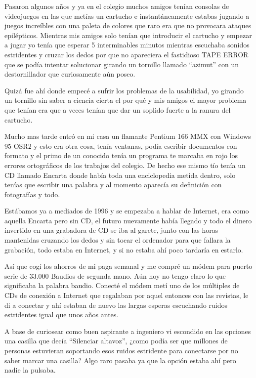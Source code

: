 \bigskip
Pasaron algunos años y ya en el colegio muchos amigos tenían consolas de videojuegos en las que metías un cartucho e instantáneamente estabas jugando a juegos increíbles con una paleta de colores que raro era que no provocara ataques epilépticos. Mientras mis amigos solo tenían que introducir el cartucho y empezar a jugar yo tenía que esperar 5 interminables minutos mientras escuchaba sonidos estridentes y cruzar los dedos por que no apareciera el fastidioso TAPE ERROR que se podía intentar solucionar girando un tornillo llamado ``azimut'' con un destornillador que curiosamente aún poseo.

\bigskip
Quizá fue ahí donde empecé a sufrir los problemas de la usabilidad, yo girando un tornillo sin saber a ciencia cierta el por qué y mis amigos el mayor problema que tenían era que a veces tenían que dar un soplido fuerte a la ranura del cartucho.

\bigskip
Mucho mas tarde entró en mi casa un flamante Pentium 166 MMX con Windows 95 OSR2 y esto era otra cosa, tenía ventanas, podía escribir documentos con formato y el primo de un conocido tenía un programa te marcaba en rojo los errores ortográficos de los trabajos del colegio. De hecho ese mismo tío tenía un CD llamado Encarta donde había toda una enciclopedia metida dentro, solo tenías que escribir una palabra y al momento aparecía su definición con fotografías y todo.

\bigskip
Estábamos ya a mediados de 1996 y se empezaba a hablar de Internet, era como aquella Encarta pero sin CD, el futuro nuevamente había llegado y todo el dinero invertido en una grabadora de CD se iba al garete, junto con las horas mantenidas cruzando los dedos y sin tocar el ordenador para que fallara la grabación, todo estaba en Internet, y si no estaba ahí poco tardaría en estarlo.

\bigskip
Así que cogí los ahorros de mi paga semanal y me compré un módem para puerto serie de 33.000 Baudios de segunda mano. Aún hoy no tengo claro lo que significaba la palabra baudio. Conecté el módem metí uno de los múltiples de CDs de conexión a Internet que regalaban por aquel entonces con las revistas, le di a conectar y ahí estaban de nuevo las largas esperas escuchando ruidos estridentes igual que unos años antes.

\bigskip
A base de curiosear como buen aspirante a ingeniero vi escondido en las opciones una casilla que decía ``Silenciar altavoz'', ¿como podía ser que millones de personas estuvieran soportando esos ruidos estridente para conectarse por no saber marcar una casilla? Algo raro pasaba ya que la opción estaba ahí pero nadie la pulsaba.

